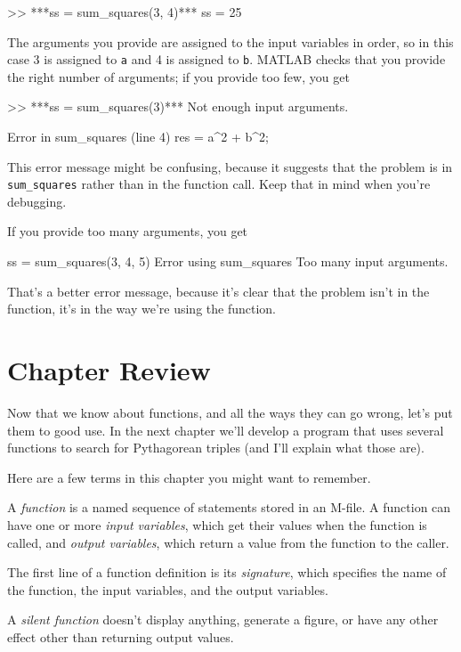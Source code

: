 \begin{code}
>> ***ss = sum_squares(3, 4)***
ss = 25
\end{code}

The arguments you provide are assigned to the input variables in
order, so in this case 3 is assigned to \lstinline{a} and 4 is assigned to
\lstinline{b}.  MATLAB checks that you provide the right number of arguments;
if you provide too few, you get

\begin{code}
>> ***ss = sum_squares(3)***
Not enough input arguments.

Error in sum_squares (line 4)
    res = a^2 + b^2;
\end{code}

This error message might be confusing, because it suggests that
the problem is in \lstinline{sum_squares} rather than in the function call.
Keep that in mind when you're debugging.

If you provide too many arguments, you get

\begin{code}
ss = sum_squares(3, 4, 5)
Error using sum_squares
Too many input arguments.
\end{code}

That's a better error message, because it's clear that the problem isn't in the function, it's in the way we're using the function.

\section{Chapter Review}

Now that we know about functions, and all the ways they can go wrong, let's put them to good use.  In the next chapter we'll develop a program that uses several functions to search for Pythagorean triples (and I'll explain what those are).

Here are a few terms in this chapter you might want to remember.

A \emph{function} is a named sequence of statements stored in an M-file.
A function can have one or more \emph{input variables}, which get their values when the function is called, and \emph{output variables}, which return a value from the function to the caller.

The first line of a function definition is its \emph{signature}, which
specifies the name of the function, the input variables, and the
output variables.

A \emph{silent function} doesn't display anything, generate a figure, or have any other effect other than returning output values.


